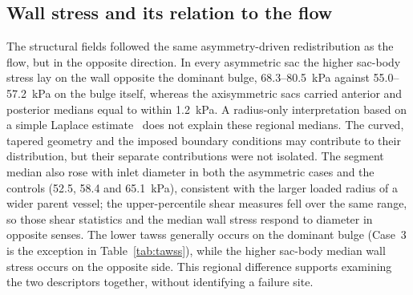 \documentclass[12pt,a4paper]{article}
\newcommand{\cfdrevision}[1]{#1} %
\newcommand{\TAWSS}{\ac{tawss}\xspace}
\theoremstyle{definition}
\numberwithin{equation}{section}
\providecommand{\DIFaddtex}[1]{{\protect\color{blue} \sf #1}} %
\providecommand{\DIFdeltex}[1]{{\protect\color{red} \scriptsize #1}} %
\providecommand{\DIFaddbegin}{} %
\providecommand{\DIFaddend}{} %
\providecommand{\DIFdelbegin}{} %
\providecommand{\DIFdelend}{} %
\providecommand{\DIFadd}[1]{\texorpdfstring{\DIFaddtex{#1}}{#1}} %
\providecommand{\DIFdel}[1]{\texorpdfstring{\DIFdeltex{#1}}{}} %
\newcommand{\DIFscaledelfig}{0.5}
\newlength{\DIFdelgraphicswidth} %
\newlength{\DIFdelgraphicsheight} %
\newcommand{\DIFaddincludegraphics}[2][]{{\color{blue}\fbox{\DIFOincludegraphics[#1]{#2}}}} %
\newcommand{\DIFdelincludegraphics}[2][]{%
\sbox{\DIFdelgraphicsbox}{\DIFOincludegraphics[#1]{#2}}%
\settoboxwidth{\DIFdelgraphicswidth}{\DIFdelgraphicsbox} %
\settoboxtotalheight{\DIFdelgraphicsheight}{\DIFdelgraphicsbox} %
\scalebox{\DIFscaledelfig}{%
\parbox[b]{\DIFdelgraphicswidth}{\usebox{\DIFdelgraphicsbox}\\[-\baselineskip] \rule{\DIFdelgraphicswidth}{0em}}\llap{\resizebox{\DIFdelgraphicswidth}{\DIFdelgraphicsheight}{%
\setlength{\unitlength}{\DIFdelgraphicswidth}%
\begin{picture}(1,1)%
\thicklines\linethickness{2pt} %
{\color[rgb]{1,0,0}\put(0,0){\framebox(1,1){}}}%
{\color[rgb]{1,0,0}\put(0,0){\line( 1,1){1}}}%
{\color[rgb]{1,0,0}\put(0,1){\line(1,-1){1}}}%
\end{picture}%
}\hspace*{3pt}}} %
} %
\DeclareRobustCommand{\DIFaddbegin}{\DIFOaddbegin \let\includegraphics\DIFaddincludegraphics} %
\DeclareRobustCommand{\DIFaddend}{\DIFOaddend \let\includegraphics\DIFOincludegraphics} %
\DeclareRobustCommand{\DIFdelbegin}{\DIFOdelbegin \let\includegraphics\DIFdelincludegraphics} %
\DeclareRobustCommand{\DIFdelend}{\DIFOaddend \let\includegraphics\DIFOincludegraphics} %
\renewcommand{\DIFaddtex}[1]{{\protect\color{red}#1}}
\renewcommand{\DIFdeltex}[1]{}
\renewcommand{\DIFdel}[1]{}
\renewcommand{\DIFaddincludegraphics}[2][]{\DIFOincludegraphics[#1]{#2}}
\renewcommand{\DIFdelincludegraphics}[2][]{}
\renewcommand{\cfdrevision}[1]{\textcolor{red}{#1}}
\def\DIFaddbegin{}\def\DIFaddend{}%
\def\DIFdelbegin{}\def\DIFdelend{}%
\def\cfdrevision#1{#1}%
\begin{document}
\subsection{Wall stress and its relation to the flow}
The structural fields followed the same asymmetry-driven redistribution as the flow, but in the opposite direction. In every asymmetric sac the higher sac-body stress lay on the wall opposite the dominant bulge, 68.3--80.5~kPa against 55.0--57.2~kPa on the bulge itself, whereas the axisymmetric sacs carried anterior and posterior medians equal to within 1.2~kPa. \DIFdelbegin \DIFdel{This is contrary to the Laplace-law expectation that stress is largest where the radius is greatest~\mbox{%
\cite{dobrin1989pathophysiology}}\hskip0pt%
, and it indicates that in these curved, tapered geometries the local wall curvature rather than the bulge amplitude sets where the modeled wall is most loaded. }\DIFdelend \DIFaddbegin \DIFadd{\cfdrevision{A radius-only interpretation based on a simple Laplace estimate~\cite{dobrin1989pathophysiology} does not explain these regional medians. The curved, tapered geometry and the imposed boundary conditions may contribute to their distribution, but their separate contributions were not isolated.} }\DIFaddend The segment median also rose with inlet diameter in both the asymmetric cases and the controls (52.5, 58.4 and 65.1~kPa), consistent with the larger loaded radius of a wider parent vessel; \DIFdelbegin \DIFdel{the shear-based quantities fell over the same range, so the two families of indices respond to diameter in opposite senses. Because the lowest }%
\DIFdel{sits on the dominant bulge while the highest stress sits on the opposite wall, the hemodynamic and structural markers identify different walls of the same sac, which supports examining them together rather than separately. 
}\DIFdelend \DIFaddbegin \DIFadd{\cfdrevision{the upper-percentile shear measures fell over the same range, so those shear statistics and the median wall stress respond to diameter in opposite senses.} \cfdrevision{The lower \TAWSS generally occurs on the dominant bulge (Case~3 is the exception in Table~\ref{tab:tawss}), while the higher sac-body median wall stress occurs on the opposite side. This regional difference supports examining the two descriptors together, without identifying a failure site.} 
}\DIFaddend 
\end{document}
